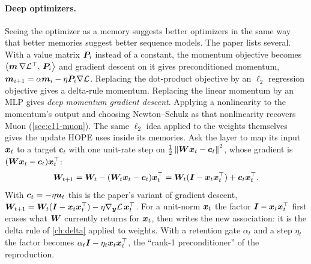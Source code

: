 \paragraph{Deep optimizers.} Seeing the optimizer as a memory suggests better optimizers in the
same way that better memories suggest better sequence models. The paper lists several. With a
value matrix $\bm{P}_i$ instead of a constant, the momentum objective becomes
$\left\langle \bm{m}\,\nabla\mathcal{L}^{\top},\, \bm{P}_i\right\rangle$ and gradient descent on it gives preconditioned momentum,
$\bm{m}_{i+1} = \alpha\bm{m}_i - \eta\bm{P}_i\nabla\mathcal{L}$. Replacing the dot-product objective by an
$\ell_2$ regression objective gives a delta-rule momentum. Replacing the linear momentum by an
MLP gives \emph{deep momentum gradient descent}. Applying a nonlinearity to the momentum's output
and choosing Newton--Schulz as that nonlinearity recovers Muon (\cref{sec:c11-muon}). The same
$\ell_2$ idea applied to the weights themselves gives the update HOPE uses inside its memories.
Ask the layer to map its input $\bm{x}_t$ to a target $\bm{c}_t$ with one unit-rate step on
$\tfrac12\left\lVert \bm{W}\bm{x}_t - \bm{c}_t\right\rVert^2$, whose gradient is $(\bm{W}\bm{x}_t - \bm{c}_t)\bm{x}_t^{\top}$:
\begin{equation}
  \bm{W}_{t+1} = \bm{W}_t - (\bm{W}_t\bm{x}_t - \bm{c}_t)\bm{x}_t^{\top} = \bm{W}_t(\bm{I} - \bm{x}_t\bm{x}_t^{\top}) + \bm{c}_t\bm{x}_t^{\top} .
  \label{eq:c11-dgd}
\end{equation}
With $\bm{c}_t = -\eta\bm{u}_t$ this is the paper's variant of gradient descent,
$\bm{W}_{t+1} = \bm{W}_t(\bm{I} - \bm{x}_t\bm{x}_t^{\top}) - \eta\nabla_{\bm{y}}\mathcal{L}\,\bm{x}_t^{\top}$. For a unit-norm $\bm{x}_t$ the
factor $\bm{I} - \bm{x}_t\bm{x}_t^{\top}$ first erases what $\bm{W}$ currently returns for $\bm{x}_t$, then writes the
new association: it is the delta rule of \cref{ch:delta} applied to weights. With a retention gate
$\alpha_t$ and a step $\eta_t$ the factor becomes $\alpha_t\bm{I} - \eta_t\bm{x}_t\bm{x}_t^{\top}$, the
``rank-1 preconditioner'' of the reproduction.

